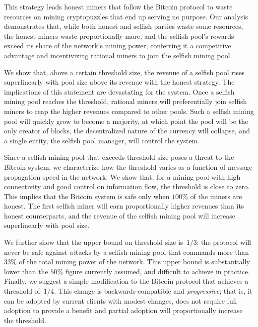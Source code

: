 \documentclass[letterpaper]{llncs}
\begin{document}
This strategy leads honest miners that follow the Bitcoin protocol to waste resources on mining cryptopuzzles that end up serving no purpose. 
Our analysis demonstrates that, while both honest and selfish parties waste some resources, the honest miners waste proportionally more, and the selfish pool's rewards exceed its share of the network's mining power, conferring it a competitive advantage and incentivizing rational miners to join the selfish mining pool.

We show that, above a certain threshold size, the revenue of a selfish pool rises superlinearly with pool size above its revenue with the honest strategy. The implications of this statement are devastating for the system. Once a selfish mining pool reaches the threshold, rational miners will preferentially join selfish miners to reap the higher revenues compared to other pools. Such a selfish mining pool will quickly grow to become a majority, at which point the pool will be the only creator of blocks, the decentralized nature of the currency will collapse, and a single entity, the selfish pool manager, will control the system. 

Since a selfish mining pool that exceeds threshold size poses a threat to the Bitcoin system, we characterize how the threshold varies as a function of 
message propagation speed in the network. We show that, for a mining pool with high connectivity and good control on information flow, the threshold is close to zero. This implies
that the Bitcoin system is safe only when $100$\% of the miners are honest. The first selfish miner will earn proportionally higher revenues than its honest counterparts, and the revenue of the selfish mining pool will increase superlinearly with pool size. 

We further show that the upper bound on threshold size is~$1/3$: the protocol will never be safe against attacks by a selfish mining pool that commands more than $33$\% of the total mining power of the network. This upper bound is substantially lower than the $50$\% figure currently assumed, and difficult to achieve in practice.
Finally, we suggest a simple modification to the Bitcoin protocol that achieves a threshold of~$1/4$. This change is backwards-compatible and \emph{progressive}; that is, it can be adopted by current clients with modest changes, does not require full adoption to provide a benefit and partial adoption will proportionally increase the threshold. 
\end{document}
